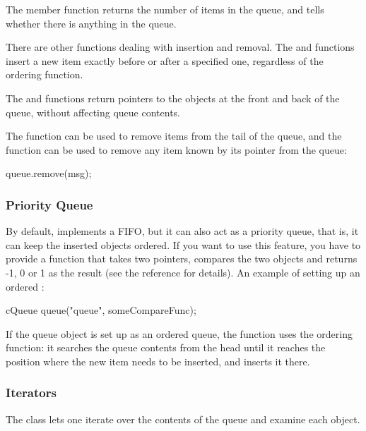 The  member function returns the number of items in the
queue, and  tells whether there is anything in the queue.

There are other functions dealing with insertion and removal.  The
 and  functions insert a
new item exactly before or after a specified one, regardless of the
ordering function.

The  and  functions return pointers to the objects
at the front and back of the queue, without affecting queue contents.

The  function can be used to remove items from the
tail of the queue, and the  function can be
used to remove any item known by its pointer from the queue:

\begin{cpp}
queue.remove(msg);
\end{cpp}


\subsubsection{Priority Queue}
\label{sec:sim-lib:cqueue-as-priority-queue}

By default,  implements a FIFO, but it can also act as
a priority queue, that is, it can keep the inserted objects
ordered.  If you want to use this feature, you have
to provide a function that takes two  pointers,
compares the two objects and returns -1, 0 or 1 as the result (see the
reference for details).  An example of setting up an ordered
:

\begin{cpp}
cQueue queue("queue", someCompareFunc);
\end{cpp}

If the queue object is set up as an ordered queue, the 
function uses the ordering function: it searches the queue contents
from the head until it reaches the position where the new item
needs to be inserted, and inserts it there.


\subsubsection{Iterators}
\label{sec:sim-lib:cqueue-iteration}

The  class lets one iterate over the contents
of the queue and examine each object.

